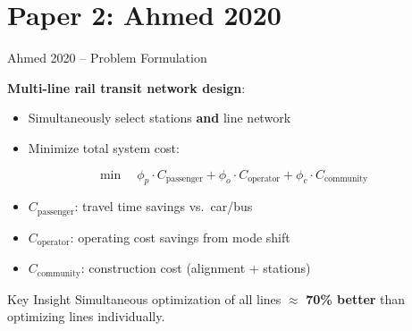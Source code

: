 \documentclass[aspectratio=169, 11pt]{beamer}
\begin{document}
\section{Paper 2: Ahmed 2020}

\begin{frame}{Ahmed 2020 -- Problem Formulation}

\textbf{Multi-line rail transit network design}:

\begin{itemize}
    \item Simultaneously select stations \textbf{and} line network
    \item Minimize total system cost:
\end{itemize}

\[
\min \quad \phi_p \cdot C_{\text{passenger}} + \phi_o \cdot C_{\text{operator}} + \phi_c \cdot C_{\text{community}}
\]

\begin{itemize}
    \item \(C_{\text{passenger}}\): travel time savings vs.\ car/bus
    \item \(C_{\text{operator}}\): operating cost savings from mode shift
    \item \(C_{\text{community}}\): construction cost (alignment + stations)
\end{itemize}

\begin{block}{Key Insight}
Simultaneous optimization of all lines \(\approx\) \textbf{70\% better} than optimizing lines individually.
\end{block}
\end{frame}
\end{document}
